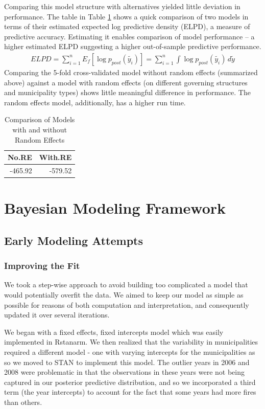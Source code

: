 \documentclass[10pt,a4paper, hidelinks]{article} %
\begin{document}
Comparing this model structure with alternatives yielded little deviation in performance. The table in Table \ref{table:ELPDmodels} shows a quick comparison of two models in terms of their estimated expected log predictive density (ELPD), a measure of predictive accuracy. Estimating it enables comparison of model performance -- a higher estimated ELPD suggesting a higher out-of-sample predictive performance.
%
\begin{align*}
ELPD = \sum_{i=1}^nE_f\left[\log p_{post}(\tilde{y_i})\right] = \sum_{i=1}^n\int \log p_{post}(\tilde{y_i}) \, d\tilde{y}
\end{align*}
Comparing the 5-fold cross-validated model without random effects (summarized above) against a model with random effects (on different governing structures and municipality types) shows little meaningful difference in performance. The random effects model, additionally, has a higher run time. 

\begin{table}[H]
\centering
\begin{tabular}{rr}
  \toprule
  No.RE & With.RE \\ 
  \midrule
 -465.92 & -579.52 \\ 
   \bottomrule
\end{tabular}
\caption{Comparison of Models with and without Random Effects} 
\label{table:ELPDmodels}
\end{table}

\section{Bayesian Modeling Framework}

\subsection{Early Modeling Attempts}
\subsubsection{Improving the Fit}
We took a step-wise approach to avoid building too complicated a model that would potentially overfit the data.  We aimed to keep our model as simple as possible for reasons of both computation and interpretation, and consequently updated it over several iterations. 

We began with a fixed effects, fixed intercepts model which was easily implemented in Rstanarm. We then realized that the variability in municipalities required a different model - one with varying intercepts for the municipalities as so we moved to STAN to implement this model. The outlier years in 2006 and 2008 were problematic in that the observations in these years were not being captured in our posterior predictive distribution, and so we incorporated a third term (the year intercepts) to account for the fact that some years had more fires than others. 
\end{document}
